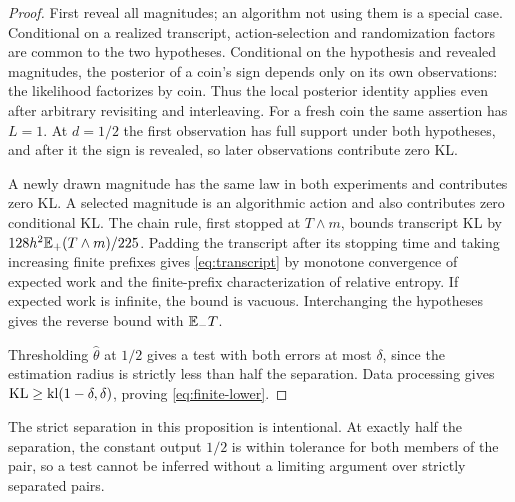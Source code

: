 \begin{proof}
First reveal all magnitudes; an algorithm not using them is a special case.
Conditional on a realized transcript, action-selection and randomization
factors are common to the two hypotheses. Conditional on the hypothesis
and revealed magnitudes, the posterior of a coin's sign depends only on
its own observations: the likelihood factorizes by coin. Thus the local
posterior identity applies even after arbitrary revisiting and
interleaving. For a fresh coin the same assertion has $L=1$.
At $d=1/2$ the first observation has full support under both hypotheses,
and after it the sign is revealed, so later observations contribute zero KL.

A newly drawn magnitude has the same law in both experiments and contributes
zero KL. A selected magnitude is an algorithmic action and also contributes
zero conditional KL. The chain rule, first stopped at $T\wedge m$, bounds
transcript KL by $128h^2\mathbb E_+(T\wedge m)/225$. Padding the transcript after its
stopping time and taking increasing finite prefixes gives
\eqref{eq:transcript} by monotone convergence of expected work and the
finite-prefix characterization of relative entropy. If expected work is
infinite, the bound is vacuous. Interchanging the hypotheses gives the
reverse bound with $\mathbb E_-T$.

Thresholding $\widehat\theta$ at $1/2$ gives a test with both errors at
most $\delta$, since the estimation radius is strictly less than half
the separation. Data processing gives
$\operatorname{KL}\ge\operatorname{kl}(1-\delta,\delta)$, proving \eqref{eq:finite-lower}.
\end{proof}

The strict separation in this proposition is intentional. At exactly half
the separation, the constant output $1/2$ is within tolerance for both
members of the pair, so a test cannot be inferred without a limiting
argument over strictly separated pairs.

